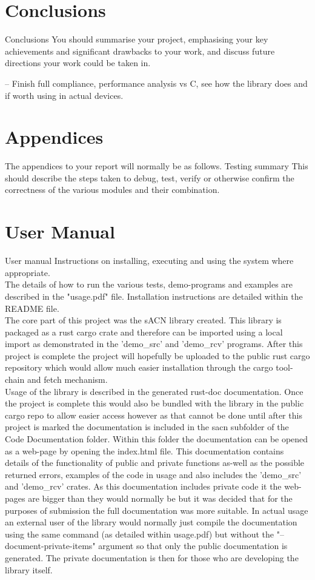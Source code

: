 \documentclass[11pt,a4paper]{article}
\begin{document}
\section{Conclusions}
Conclusions
You should summarise your project, emphasising your
key achievements and significant drawbacks to your
work, and discuss future directions your work could be
taken in.

-- Finish full compliance, performance analysis vs C, see how the library does and if worth using in actual devices. 

\section{Appendices}
The appendices to your report will normally be as follows.
Testing
summary
This should describe the steps taken to debug, test,
verify or otherwise confirm the correctness of the
various modules and their combination.

\section{User Manual}
User manual Instructions on installing, executing and using the
system where appropriate.\\

The details of how to run the various tests, demo-programs and examples are described in the "usage.pdf" file. Installation instructions are detailed within the README file.\\

The core part of this project was the sACN library created. This library is packaged as a rust cargo crate and therefore can be imported using a local import as demonstrated in the 'demo\_src' and 'demo\_rcv' programs. After this project is complete the project will hopefully be uploaded to the public rust cargo repository which would allow much easier installation through the cargo tool-chain and fetch mechanism.\\

Usage of the library is described in the generated rust-doc documentation. Once the project is complete this would also be bundled with the library in the public cargo repo to allow easier access however as that cannot be done until after this project is marked the documentation is included in the sacn subfolder of the Code Documentation folder. Within this folder the documentation can be opened as a web-page by opening the index.html file. This documentation contains details of the functionality of public and private functions as-well as the possible returned errors, examples of the code in usage and also includes the 'demo\_src' and 'demo\_rcv' crates. As this documentation includes private code it the web-pages are bigger than they would normally be but it was decided that for the purposes of submission the full documentation was more suitable. In actual usage an external user of the library would normally just compile the documentation using the same command (as detailed within usage.pdf) but without the "--document-private-items" argument so that only the public documentation is generated. The private documentation is then for those who are developing the library itself.\\
\end{document}

